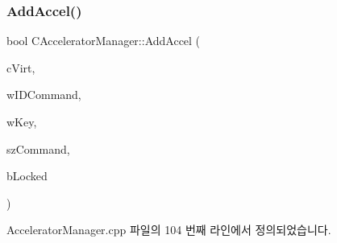 \subsubsection{\texorpdfstring{Add\+Accel()}{AddAccel()}}
{\footnotesize\ttfamily bool C\+Accelerator\+Manager\+::\+Add\+Accel (\begin{DoxyParamCaption}\item[{B\+Y\+TE}]{c\+Virt,  }\item[{W\+O\+RD}]{w\+I\+D\+Command,  }\item[{W\+O\+RD}]{w\+Key,  }\item[{L\+P\+C\+T\+S\+TR}]{sz\+Command,  }\item[{bool}]{b\+Locked }\end{DoxyParamCaption})\hspace{0.3cm}{\ttfamily [protected]}}



Accelerator\+Manager.\+cpp 파일의 104 번째 라인에서 정의되었습니다.


